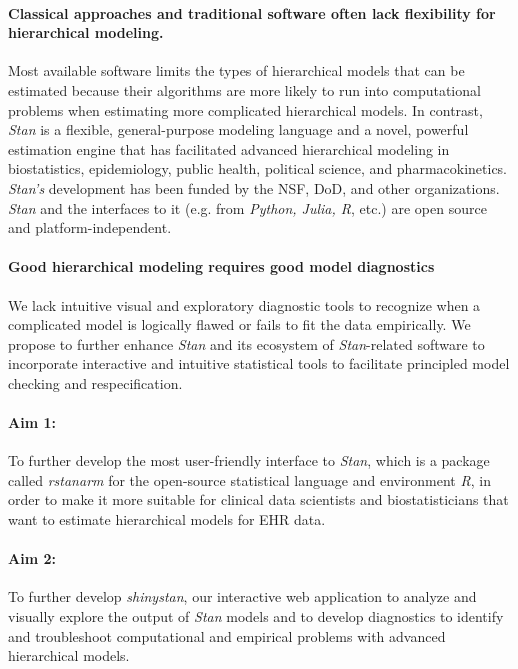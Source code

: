 \documentclass[11pt,notitlepage]{article}
\begin{document}
\paragraph*{Classical approaches and traditional software often lack flexibility 
for hierarchical modeling.} Most available software limits the types of 
hierarchical models that can be estimated because their algorithms are more likely 
to run into computational problems when estimating more complicated hierarchical models.
In contrast, \textit{Stan} is a flexible, general-purpose modeling language and a 
novel, powerful estimation engine that has facilitated 
advanced hierarchical modeling in biostatistics, epidemiology, public health, 
political science, and pharmacokinetics. \textit{Stan's} development has been funded 
by the NSF, DoD, and other organizations. \textit{Stan} and the interfaces to it
(e.g. from \textit{Python, Julia, R}, etc.) are open source and platform-independent.

\paragraph*{Good hierarchical modeling requires good model diagnostics} 
We lack intuitive visual and exploratory diagnostic tools to recognize when a complicated model is logically 
flawed or fails to fit the data empirically. We propose to further enhance \textit{Stan} and its ecosystem of 
\textit{Stan}-related software to incorporate interactive and intuitive statistical tools to facilitate principled model 
checking and respecification.

\paragraph*{Aim 1:} To further develop the most user-friendly interface to \textit{Stan}, 
which is a package called \textit{rstanarm} for the open-source statistical language and 
environment \textit{R}, in order to make it more suitable for clinical data 
scientists and biostatisticians that want to estimate hierarchical models for EHR data.

\paragraph*{Aim 2:} To further develop \textit{shinystan}, our interactive web application to 
analyze and visually explore the output of \textit{Stan} models and to develop diagnostics 
to identify and troubleshoot computational and empirical problems with advanced hierarchical models.
\end{document}
